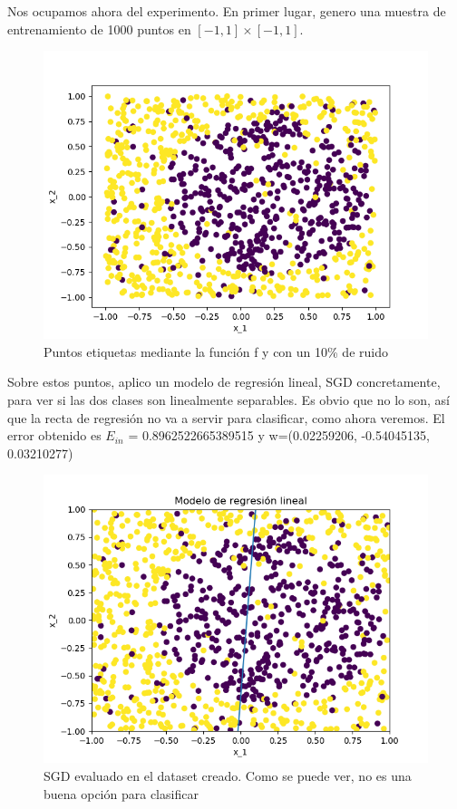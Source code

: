 Nos ocupamos ahora del experimento. En primer lugar, genero una muestra de entrenamiento de 1000 puntos en $[-1,1]\times[-1,1]$.
\begin{figure}[H] %
	\centering
	\includegraphics[scale=0.6]{puntos2.png}  %
	\caption{Puntos etiquetas mediante la función f y con un 10\% de ruido} 
	\label{fig:puntos2D-et}
\end{figure}
 
Sobre estos puntos, aplico un modelo de regresión lineal, SGD concretamente, para ver si las dos clases son linealmente separables. Es obvio que no lo son, así que la recta de regresión no va a servir para clasificar, como ahora veremos. El error obtenido es $E_{in}$ = 0.8962522665389515 y w=(0.02259206, -0.54045135, 0.03210277)

\begin{figure}[H] %
	\centering
	\includegraphics[scale=0.6]{sgd-puntos.png}  %
	\caption{SGD evaluado en el dataset creado. Como se puede ver, no es una buena opción para clasificar} 
	\label{fig:sgd-p}
\end{figure}

